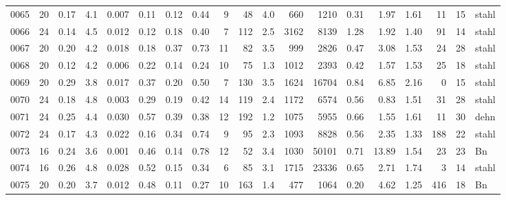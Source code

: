 {\begin{longtable}{@{}lrrrrrrrrrrrrrrrrrl@{}}
0065 & 20 & \num{0.17} & \num{4.1} & \num{0.007} & \num{0.11} & \num{0.12} & \num{0.44} & 9 & \num{48} & \num{4.0} & \num{660} & \num{1210} & \num{0.31} & \num{1.97} & \num{1.61} & \num{11} & \num{15} & stahl \\
0066 & 24 & \num{0.14} & \num{4.5} & \num{0.012} & \num{0.12} & \num{0.18} & \num{0.40} & 7 & \num{112} & \num{2.5} & \num{3162} & \num{8139} & \num{1.28} & \num{1.92} & \num{1.40} & \num{91} & \num{14} & stahl \\
0067 & 20 & \num{0.20} & \num{4.2} & \num{0.018} & \num{0.18} & \num{0.37} & \num{0.73} & 11 & \num{82} & \num{3.5} & \num{999} & \num{2826} & \num{0.47} & \num{3.08} & \num{1.53} & \num{24} & \num{28} & stahl \\
0068 & 20 & \num{0.12} & \num{4.2} & \num{0.006} & \num{0.22} & \num{0.14} & \num{0.24} & 10 & \num{75} & \num{1.3} & \num{1012} & \num{2393} & \num{0.42} & \num{1.57} & \num{1.53} & \num{25} & \num{18} & stahl \\
0069 & 20 & \num{0.29} & \num{3.8} & \num{0.017} & \num{0.37} & \num{0.20} & \num{0.50} & 7 & \num{130} & \num{3.5} & \num{1624} & \num{16704} & \num{0.84} & \num{6.85} & \num{2.16} & \num{0} & \num{15} & stahl \\
0070 & 24 & \num{0.18} & \num{4.8} & \num{0.003} & \num{0.29} & \num{0.19} & \num{0.42} & 14 & \num{119} & \num{2.4} & \num{1172} & \num{6574} & \num{0.56} & \num{0.83} & \num{1.51} & \num{31} & \num{28} & stahl \\
0071 & 24 & \num{0.25} & \num{4.4} & \num{0.030} & \num{0.57} & \num{0.39} & \num{0.38} & 12 & \num{192} & \num{1.2} & \num{1075} & \num{5955} & \num{0.66} & \num{1.55} & \num{1.61} & \num{11} & \num{30} & dehn \\
0072 & 24 & \num{0.17} & \num{4.3} & \num{0.022} & \num{0.16} & \num{0.34} & \num{0.74} & 9 & \num{95} & \num{2.3} & \num{1093} & \num{8828} & \num{0.56} & \num{2.35} & \num{1.33} & \num{188} & \num{22} & stahl \\
0073 & 16 & \num{0.24} & \num{3.6} & \num{0.001} & \num{0.46} & \num{0.14} & \num{0.78} & 12 & \num{52} & \num{3.4} & \num{1030} & \num{50101} & \num{0.71} & \num{13.89} & \num{1.54} & \num{23} & \num{23} & Bn \\
0074 & 16 & \num{0.26} & \num{4.8} & \num{0.028} & \num{0.52} & \num{0.15} & \num{0.34} & 6 & \num{85} & \num{3.1} & \num{1715} & \num{23336} & \num{0.65} & \num{2.71} & \num{1.74} & \num{3} & \num{14} & stahl \\
0075 & 20 & \num{0.20} & \num{3.7} & \num{0.012} & \num{0.48} & \num{0.11} & \num{0.27} & 10 & \num{163} & \num{1.4} & \num{477} & \num{1064} & \num{0.20} & \num{4.62} & \num{1.25} & \num{416} & \num{18} & Bn \\

\end{longtable}}
